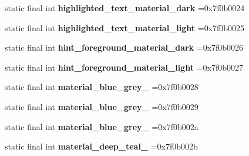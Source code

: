 \begin{DoxyCompactItemize}
\item 
\hypertarget{classcheck_1_1test_1_1_r_1_1color_a8e037c7e91473cc4da69c11a9e3a565d}{}static final int {\bfseries highlighted\+\_\+text\+\_\+material\+\_\+dark} =0x7f0b0024\label{classcheck_1_1test_1_1_r_1_1color_a8e037c7e91473cc4da69c11a9e3a565d}

\item 
\hypertarget{classcheck_1_1test_1_1_r_1_1color_ae2ca924730b0246acc5c21fca8a6ce03}{}static final int {\bfseries highlighted\+\_\+text\+\_\+material\+\_\+light} =0x7f0b0025\label{classcheck_1_1test_1_1_r_1_1color_ae2ca924730b0246acc5c21fca8a6ce03}

\item 
\hypertarget{classcheck_1_1test_1_1_r_1_1color_a7989ae4ea43c93abfae26fa070741223}{}static final int {\bfseries hint\+\_\+foreground\+\_\+material\+\_\+dark} =0x7f0b0026\label{classcheck_1_1test_1_1_r_1_1color_a7989ae4ea43c93abfae26fa070741223}

\item 
\hypertarget{classcheck_1_1test_1_1_r_1_1color_ae8e410ccdb63b71a1524c5ce74066a94}{}static final int {\bfseries hint\+\_\+foreground\+\_\+material\+\_\+light} =0x7f0b0027\label{classcheck_1_1test_1_1_r_1_1color_ae8e410ccdb63b71a1524c5ce74066a94}

\item 
\hypertarget{classcheck_1_1test_1_1_r_1_1color_a2e47945f26c10e8bc0386fbe7848f8ea}{}static final int {\bfseries material\+\_\+blue\+\_\+grey\+\_} =0x7f0b0028\label{classcheck_1_1test_1_1_r_1_1color_a2e47945f26c10e8bc0386fbe7848f8ea}

\item 
\hypertarget{classcheck_1_1test_1_1_r_1_1color_adcfaec5b1af6c07a434aacdea5b455bf}{}static final int {\bfseries material\+\_\+blue\+\_\+grey\+\_} =0x7f0b0029\label{classcheck_1_1test_1_1_r_1_1color_adcfaec5b1af6c07a434aacdea5b455bf}

\item 
\hypertarget{classcheck_1_1test_1_1_r_1_1color_a0c5722841748022da5e52a9521cad336}{}static final int {\bfseries material\+\_\+blue\+\_\+grey\+\_} =0x7f0b002a\label{classcheck_1_1test_1_1_r_1_1color_a0c5722841748022da5e52a9521cad336}

\item 
\hypertarget{classcheck_1_1test_1_1_r_1_1color_a5738c87138ca1d59cb771ec702ed45ba}{}static final int {\bfseries material\+\_\+deep\+\_\+teal\+\_} =0x7f0b002b\label{classcheck_1_1test_1_1_r_1_1color_a5738c87138ca1d59cb771ec702ed45ba}


\end{DoxyCompactItemize}
